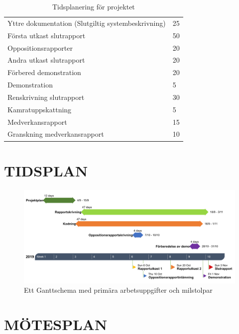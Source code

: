 \documentclass[a4paper]{article}
\begin{document}
\begin{table}[b]
\begin{tabular}{|l|l|}
Yttre dokumentation (Slutgiltig systembeskrivning)        & 25               \\
Första utkast slutrapport                                 & 50               \\
Oppositionsrapporter                                      & 20               \\
Andra utkast slutrapport                                  & 20               \\
Förbered demonstration                                    & 20               \\
Demonstration                                             & 5               \\
Renskrivning slutrapport                                  & 30               \\
Kamratuppskattning                                        & 5                \\
Medverkansrapport                                         & 15               \\
Granskning medverkansrapport                              & 10               \\ \hline
\end{tabular}
\caption{Tidsplanering för projektet}
\label{tab:aktiviteter}
\end{table}

\section{TIDSPLAN}
\label{sec:tidsplan}

\begin{figure}[!ht]
	\includegraphics[width=1\textwidth]{figurer/Gantt.png}
	\caption{Ett Ganttschema med primära arbetsuppgifter och milstolpar}
	\label{fig:Gantt}
\end{figure}

\section{MÖTESPLAN}
\label{sec:mötesplan}
\end{document}
